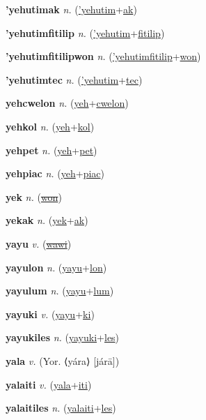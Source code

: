 \textbf{\hypertarget{'yehutimak}{'yehutimak}} \textit{n.} (\hyperlink{'yehutim}{'yehutim}+\allowbreak \hyperlink{ak}{ak})


\textbf{\hypertarget{'yehutimfitilip}{'yehutimfitilip}} \textit{n.} (\hyperlink{'yehutim}{'yehutim}+\allowbreak \hyperlink{fitilip}{fitilip})


\textbf{\hypertarget{'yehutimfitilipwon}{'yehutimfitilipwon}} \textit{n.} (\hyperlink{'yehutimfitilip}{'yehutimfitilip}+\allowbreak \hyperlink{won}{won})


\textbf{\hypertarget{'yehutimtec}{'yehutimtec}} \textit{n.} (\hyperlink{'yehutim}{'yehutim}+\allowbreak \hyperlink{tec}{tec})


\textbf{\hypertarget{yehcwelon}{yehcwelon}} \textit{n.} (\hyperlink{yeh}{yeh}+\allowbreak \hyperlink{cwelon}{cwelon})


\textbf{\hypertarget{yehkol}{yehkol}} \textit{n.} (\hyperlink{yeh}{yeh}+\allowbreak \hyperlink{kol}{kol})


\textbf{\hypertarget{yehpet}{yehpet}} \textit{n.} (\hyperlink{yeh}{yeh}+\allowbreak \hyperlink{pet}{pet})


\textbf{\hypertarget{yehpiac}{yehpiac}} \textit{n.} (\hyperlink{yeh}{yeh}+\allowbreak \hyperlink{piac}{piac})


\textbf{\hypertarget{yek}{yek}} \textit{n.} (\hyperlink{won}{\sout{won}})


\textbf{\hypertarget{yekak}{yekak}} \textit{n.} (\hyperlink{yek}{yek}+\allowbreak \hyperlink{ak}{ak})


\textbf{\hypertarget{yayu}{yayu}} \textit{v.} (\hyperlink{wawi}{\sout{wawi}})


\textbf{\hypertarget{yayulon}{yayulon}} \textit{n.} (\hyperlink{yayu}{yayu}+\allowbreak \hyperlink{lon}{lon})


\textbf{\hypertarget{yayulum}{yayulum}} \textit{n.} (\hyperlink{yayu}{yayu}+\allowbreak \hyperlink{lum}{lum})


\textbf{\hypertarget{yayuki}{yayuki}} \textit{v.} (\hyperlink{yayu}{yayu}+\allowbreak \hyperlink{ki}{ki})


\textbf{\hypertarget{yayukiles}{yayukiles}} \textit{n.} (\hyperlink{yayuki}{yayuki}+\allowbreak \hyperlink{les}{les})


\textbf{\hypertarget{yala}{yala}} \textit{v.} (Yor. ⟨yára⟩ [járā])


\textbf{\hypertarget{yalaiti}{yalaiti}} \textit{v.} (\hyperlink{yala}{yala}+\allowbreak \hyperlink{iti}{iti})


\textbf{\hypertarget{yalaitiles}{yalaitiles}} \textit{n.} (\hyperlink{yalaiti}{yalaiti}+\allowbreak \hyperlink{les}{les})


